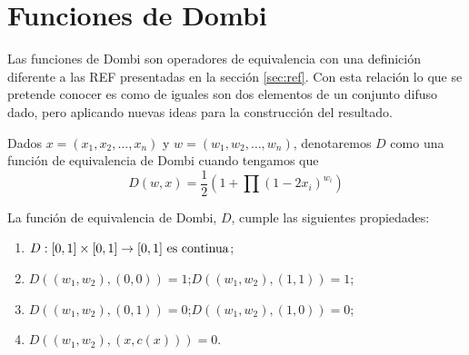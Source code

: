 \documentclass[main]{subfiles}
\begin{document}
\section{Funciones de Dombi}\label{sec:dombi}
Las funciones de Dombi \cite{art:dombi} son operadores de equivalencia con una definición diferente a las REF presentadas en la sección \ref{sec:ref}. Con esta relación lo que se pretende conocer es como de iguales son dos elementos de un conjunto difuso dado, pero aplicando nuevas ideas para la construcción del resultado.
\begin{definition}\label{def:dombi}
Dados ${x=(x_1, x_2, \dots,x_n)}$ y ${w=(w_1,w_2,\dots,w_n)}$, denotaremos $D$ como una función de equivalencia de Dombi cuando tengamos que
$$D(w,x)=\frac{1}{2}\left(1+\prod(1-2x_{i})^{w_{i}}\right)$$
\end{definition}
\begin{lemma}\label{def:propiedadesdombi}
La función de equivalencia de Dombi, $D$, cumple las siguientes propiedades:
\begin{enumerate}
	\item $D:[0,1]\times[0,1] \rightarrow [0,1] \text{ es continua}$;
	\item $D((w_1,w_2),(0,0)) = 1$;\quad$D((w_1,w_2),(1,1)) = 1$;
	\item $D((w_1,w_2),(0,1)) = 0$;\quad$D((w_1,w_2),(1,0)) = 0$;
	\item $D((w_1,w_2),(x,c(x))) = 0$.
\end{enumerate}
\end{lemma}
\end{document}
